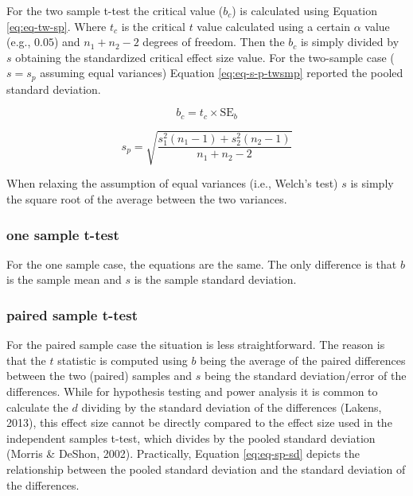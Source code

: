 \documentclass[
  man]{apa7}
\begin{document}
For the two sample t-test the critical value (\(b_c\)) is calculated using Equation \eqref{eq:eq-tw-sp}. Where \(t_c\) is the critical \(t\) value calculated using a certain \(\alpha\) value (e.g., \(0.05\)) and \(n_1 + n_2 - 2\) degrees of freedom. Then the \(b_c\) is simply divided by \(s\) obtaining the standardized critical effect size value. For the two-sample case (\(s = s_p\) assuming equal variances) Equation \eqref{eq:eq-s-p-twsmp} reported the pooled standard deviation.

\begin{equation}
    \label{eq:eq-tw-sp}
    b_c = t_c \times \text{SE}_{b}
\end{equation}

\begin{equation}
    \label{eq:eq-s-p-twsmp}
    s_p = \sqrt{\frac{s_1^2 (n_1 - 1) + s_2^2 (n_2 - 1)}{n_1 + n_2 - 2}}
\end{equation}

When relaxing the assumption of equal variances (i.e., Welch's test) \(s\) is simply the square root of the average between the two variances.

\hypertarget{one-sample-t-test}{%
\subsubsection{one sample t-test}\label{one-sample-t-test}}

For the one sample case, the equations are the same. The only difference is that \(b\) is the sample mean and \(s\) is the sample standard deviation.

\hypertarget{paired-sample-t-test}{%
\subsubsection{paired sample t-test}\label{paired-sample-t-test}}

For the paired sample case the situation is less straightforward. The reason is that the \(t\) statistic is computed using \(b\) being the average of the paired differences between the two (paired) samples and \(s\) being the standard deviation/error of the differences. While for hypothesis testing and power analysis it is common to calculate the \(d\) dividing by the standard deviation of the differences (Lakens, 2013), this effect size cannot be directly compared to the effect size used in the independent samples t-test, which divides by the pooled standard deviation (Morris \& DeShon, 2002). Practically, Equation \eqref{eq:eq-sp-sd} depicts the relationship between the pooled standard deviation and the standard deviation of the differences.
\end{document}
